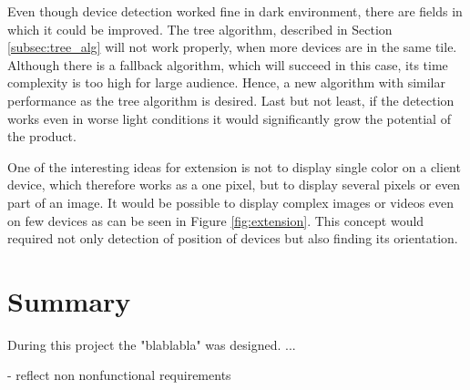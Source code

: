 Even though device detection worked fine in dark environment, there are fields in which it could be improved.
The tree algorithm, described in Section \ref{subsec:tree_alg} will not work properly, when more devices are in the same tile.
Although there is a fallback algorithm, which will succeed in this case, its time complexity is too high for large audience.
Hence, a new algorithm with similar performance as the tree algorithm is desired.
Last but not least, if the detection works even in worse light conditions it would significantly grow the potential of the product.

One of the interesting ideas for extension is not to display single color on a client device, which therefore works as a one pixel, but to display several pixels or even part of an image.
It would be possible to display complex images or videos even on few devices as can be seen in Figure \ref{fig:extension}.
This concept would required not only detection of position of devices but also finding its orientation.


\section{Summary}
During this project the "blablabla" was designed. ...


- reflect non nonfunctional requirements
